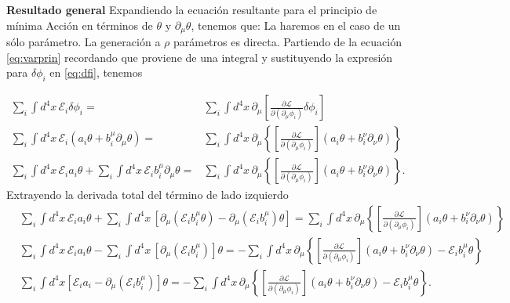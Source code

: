 \textbf{Resultado general}
Expandiendo la ecuación resultante para el principio de mínima Acción en términos de $\theta$ y $\partial_\mu\theta$, tenemos que:
La haremos en el caso de un sólo parámetro. La generación a $\rho$ parámetros es directa. Partiendo de la ecuación \eqref{eq:varprin} recordando que proviene de una integral y sustituyendo la expresión para $\delta\phi_i$ en \eqref{eq:dfi}, tenemos
\begin{frame}
\begin{align}
    \sum_i\int {d^4}x\, \mathcal{E}_i \delta\phi_i = & \sum_{i}\int {d^4}x\, \partial_{\mu} \left[  \frac{\partial\mathcal{L}}{\partial(\partial_{\mu}\phi_i)}\delta\phi_i \right]\nonumber\\
      \sum_i \int {d^4}x\, \mathcal{E}_i \left( a_i \theta +b^{\mu}_i \partial_{\mu}\theta \right) =&  \sum_i \int {d^4}x\, \partial_{\mu} \left\{ \left[ \frac{\partial\mathcal{L}}{\partial(\partial_{\mu}\phi_i)}\right] \left( a_i \theta +b^{\nu}_i \partial_{\nu}\theta \right)  \right\}\nonumber\\
      \sum_i \int {d^4}x\, \mathcal{E}_ia_i \theta+\sum_i \int {d^4}x\, \mathcal{E}_i b^{\mu}_i \partial_{\mu}\theta  =&  \sum_i \int {d^4}x\, \partial_{\mu} \left\{ \left[ \frac{\partial\mathcal{L}}{\partial(\partial_{\mu}\phi_i)}\right] \left( a_i \theta +b^{\nu}_i \partial_{\nu}\theta \right)  \right\}.
\end{align}
Extrayendo la derivada total del término de lado izquierdo 
\begin{align}
\label{eq:tn1}
   &   \sum_i \int {d^4}x\, \mathcal{E}_ia_i \theta+\sum_i \int {d^4}x\, \left[ \partial_{\mu} \left(  \mathcal{E}_i b^{\mu}_i \theta \right)-\partial_{\mu} \left(  \mathcal{E}_i b^{\mu}_i  \right) \theta \right]  =  \sum_i \int {d^4}x\, \partial_{\mu} \left\{ \left[ \frac{\partial\mathcal{L}}{\partial(\partial_{\mu}\phi_i)}\right] \left( a_i \theta +b^{\nu}_i \partial_{\nu}\theta \right)  \right\}\nonumber\\
&        \sum_i \int {d^4}x\, \mathcal{E}_ia_i \theta-\sum_i \int {d^4}x\, \left[ \partial_{\mu}   \left(  \mathcal{E}_i b^{\mu}_i  \right) \right] \theta   =-  \sum_i \int {d^4}x\, \partial_{\mu} \left\{ \left[ \frac{\partial\mathcal{L}}{\partial(\partial_{\mu}\phi_i)}\right] \left( a_i \theta +b^{\nu}_i \partial_{\nu}\theta \right) -\mathcal{E}_i b^{\mu}_i \theta  \right\} \nonumber\\
&        \sum_i\int {d^4}x \left[ \mathcal{E}_ia_i -  \partial_{\mu}   \left(  \mathcal{E}_i b^{\mu}_i  \right) \right]  \theta   =-  \sum_i \int {d^4}x\, \partial_{\mu} \left\{ \left[ \frac{\partial\mathcal{L}}{\partial(\partial_{\mu}\phi_i)}\right] \left( a_i \theta +b^{\nu}_i \partial_{\nu}\theta \right) -\mathcal{E}_i b^{\mu}_i \theta  \right\}.
\end{align}
\end{frame}


